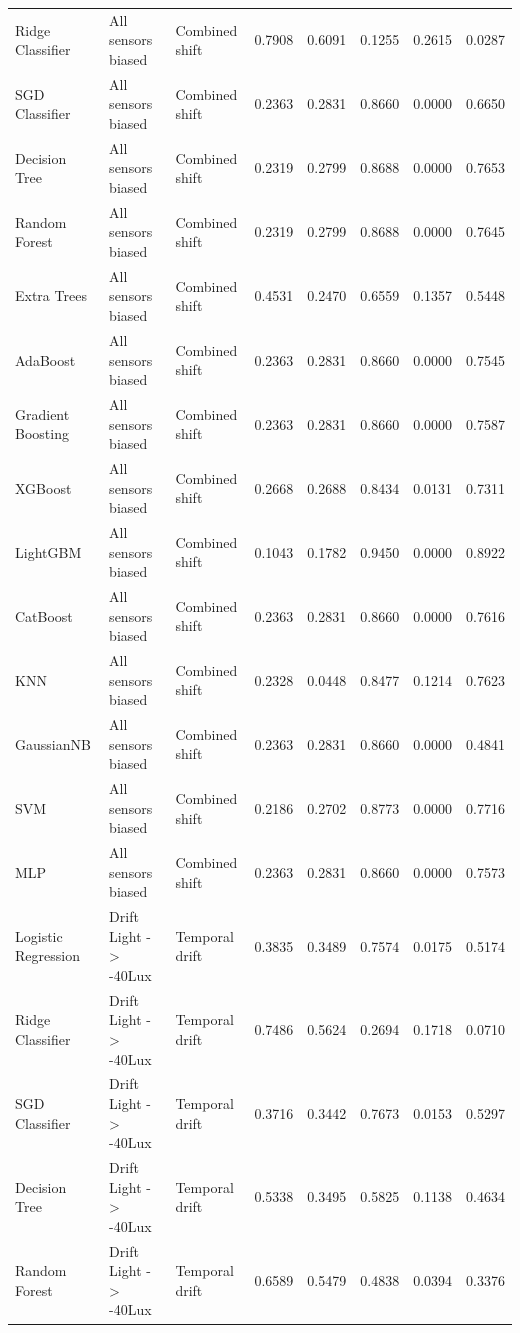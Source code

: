 \begin{tabular}{lllrrrrr}
Ridge Classifier & All sensors biased & Combined shift & 0.7908 & 0.6091 & 0.1255 & 0.2615 & 0.0287 \\
SGD Classifier & All sensors biased & Combined shift & 0.2363 & 0.2831 & 0.8660 & 0.0000 & 0.6650 \\
Decision Tree & All sensors biased & Combined shift & 0.2319 & 0.2799 & 0.8688 & 0.0000 & 0.7653 \\
Random Forest & All sensors biased & Combined shift & 0.2319 & 0.2799 & 0.8688 & 0.0000 & 0.7645 \\
Extra Trees & All sensors biased & Combined shift & 0.4531 & 0.2470 & 0.6559 & 0.1357 & 0.5448 \\
AdaBoost & All sensors biased & Combined shift & 0.2363 & 0.2831 & 0.8660 & 0.0000 & 0.7545 \\
Gradient Boosting & All sensors biased & Combined shift & 0.2363 & 0.2831 & 0.8660 & 0.0000 & 0.7587 \\
XGBoost & All sensors biased & Combined shift & 0.2668 & 0.2688 & 0.8434 & 0.0131 & 0.7311 \\
LightGBM & All sensors biased & Combined shift & 0.1043 & 0.1782 & 0.9450 & 0.0000 & 0.8922 \\
CatBoost & All sensors biased & Combined shift & 0.2363 & 0.2831 & 0.8660 & 0.0000 & 0.7616 \\
KNN & All sensors biased & Combined shift & 0.2328 & 0.0448 & 0.8477 & 0.1214 & 0.7623 \\
GaussianNB & All sensors biased & Combined shift & 0.2363 & 0.2831 & 0.8660 & 0.0000 & 0.4841 \\
SVM & All sensors biased & Combined shift & 0.2186 & 0.2702 & 0.8773 & 0.0000 & 0.7716 \\
MLP & All sensors biased & Combined shift & 0.2363 & 0.2831 & 0.8660 & 0.0000 & 0.7573 \\
Logistic Regression & Drift Light -> -40Lux & Temporal drift & 0.3835 & 0.3489 & 0.7574 & 0.0175 & 0.5174 \\
Ridge Classifier & Drift Light -> -40Lux & Temporal drift & 0.7486 & 0.5624 & 0.2694 & 0.1718 & 0.0710 \\
SGD Classifier & Drift Light -> -40Lux & Temporal drift & 0.3716 & 0.3442 & 0.7673 & 0.0153 & 0.5297 \\
Decision Tree & Drift Light -> -40Lux & Temporal drift & 0.5338 & 0.3495 & 0.5825 & 0.1138 & 0.4634 \\
Random Forest & Drift Light -> -40Lux & Temporal drift & 0.6589 & 0.5479 & 0.4838 & 0.0394 & 0.3376 \\

\end{tabular}
